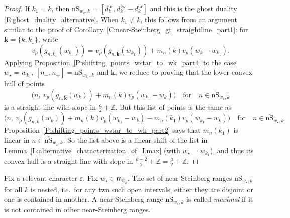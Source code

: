 \begin{proof}
    If $k_1=k$, then $\overline {\mathrm{nS}}_{w_k, k} = [d_k^{\mathrm{ur}}, d_k^{\mathrm{Iw}}-d_k^{\mathrm{ur}}]$ and this is the ghost duality \eqref{E:ghost_duality_alternative}. When $k_1 \neq k$, this follows from an argument similar to the proof of Corollary~\ref{C:near-Steinberg_gt_straightline_part1}: for ${\mathbf{k}}= \{k, k_1\}$, write $$v_p(g_{n,\hat k_1}(w_{k_1}))= v_p(g_{n,\hat {\mathbf{k}}}(w_{k_1})) + m_n(k)v_p(w_k-w_{k_1}).$$ Applying Proposition~\ref{P:shifting_points_wstar_to_wk_part4} to the case $w_\star = w_{k_1}$, $[n_-,n_+] = \overline {\mathrm{nS}}_{w_{k_1},k}$ and ${\mathbf{k}}$, we reduce to proving that the lower convex hull of points
    $$
    \big(n, \ v_p(g_{n,\hat {\mathbf{k}}}(w_{k})) + m_n(k) v_p(w_{k_1}-w_k) \big)\quad \textrm{for} \quad n \in \overline {\mathrm{nS}}_{w_\star, k}
    $$
    is a straight line with slope in  $\frac a2 + {\mathbb{Z}}$. But this list of points is the same as
    $$
    \big(n, \ v_p(g_{n,\hat k}(w_{k})) + m_n(k)v_p(w_{k_1}-w_k)-m_n(k_1)v_p(w_{k_1}-w_k)  \big)\quad \textrm{for} \quad n \in \overline {\mathrm{nS}}_{w_\star, k}.
    $$
    Proposition~\ref{P:shifting_points_wstar_to_wk_part2} says that $m_n(k_1)$ is linear in $n \in \overline {\mathrm{nS}}_{w_\star, k}$. So the list above is a linear shift of the list in Lemma~\ref{L:alternative_characterization_of_Lmax} (with $w_\star = w_{k_1}$), and thus its convex hull is a straight line with slope in  $\frac{k-2}2 + {\mathbb{Z}}= \frac a2 + {\mathbb{Z}}$.
\end{proof}

\begin{theorem}
    \label{T:near_Steinberg_non-vertex_part1}
    Fix a relevant character $\varepsilon$.
    Fix $w_\star \in {\mathfrak{m}}_{{\mathbb{C}}_p}$.
    The set of near-Steinberg ranges ${\mathrm{nS}}_{w_\star, k}$ for all $k$ is nested, i.e.\ for any two such open intervals, either they are disjoint or one is contained in another.
    A near-Steinberg range ${\mathrm{nS}}_{w_\star, k}$ is called \emph{maximal} if it is not contained in other near-Steinberg ranges.
\end{theorem}

